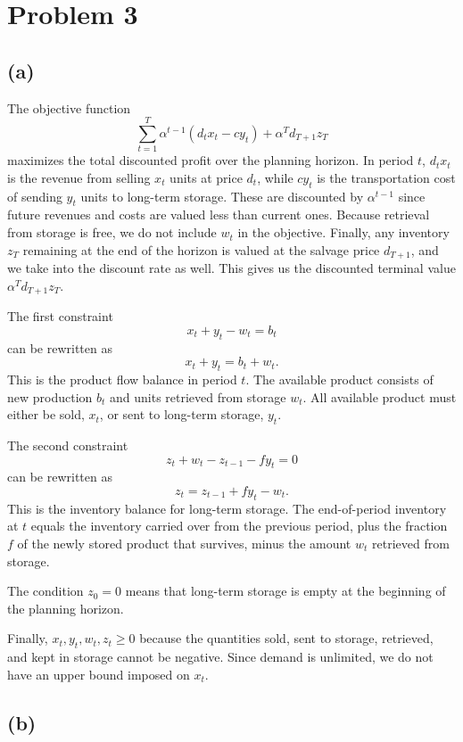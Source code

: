 \documentclass{article}
\begin{document}
\newpage


\section*{Problem 3}


\subsection*{(a)}


The objective function
\[
\sum_{t=1}^T \alpha^{t-1}(d_t x_t-cy_t)
+\alpha^T d_{T+1}z_T
\]
maximizes the total discounted profit over the planning horizon. In
period $t$, $d_t x_t$ is the revenue from selling $x_t$ units at price
$d_t$, while $cy_t$ is the transportation cost of sending $y_t$ units
to long-term storage. These are discounted by $\alpha^{t-1}$ since
future revenues and costs are valued less than current ones. Because retrieval
from storage is free, we do not include $w_t$ in the objective. Finally,
any inventory $z_T$ remaining at the end of the horizon is valued at the
salvage price $d_{T+1}$, and we take into the discount rate as well. This gives us the discounted terminal value
$\alpha^T d_{T+1}z_T$.

The first constraint
\[
x_t+y_t-w_t=b_t
\]
can be rewritten as
\[
x_t+y_t=b_t+w_t.
\]
This is the product flow balance in period $t$. The available product
consists of new production $b_t$ and units retrieved from storage $w_t$.
All available product must either be sold, $x_t$, or sent to long-term
storage, $y_t$.

The second constraint
\[
z_t+w_t-z_{t-1}-fy_t=0
\]
can be rewritten as
\[
z_t=z_{t-1}+fy_t-w_t.
\]
This is the inventory balance for long-term storage. The end-of-period
inventory at $t$ equals the inventory carried over from the previous period,
plus the fraction $f$ of the newly stored product that survives, minus
the amount $w_t$ retrieved from storage.

The condition $
z_0=0
$
means that long-term storage is empty at the beginning of the planning
horizon.

Finally,
$
x_t,y_t,w_t,z_t\geq0
$
because the quantities sold, sent to storage, retrieved, and kept in
storage cannot be negative. Since demand is unlimited, we do not have an
upper bound imposed on $x_t$.


\vspace{5mm}
\subsection*{(b)}
\end{document}
